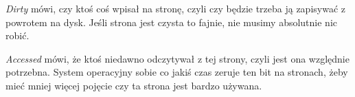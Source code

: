 \textit{Dirty} mówi, czy ktoś coś wpisał na stronę, czyli czy będzie trzeba ją zapisywać z powrotem na dysk.
Jeśli strona jest czysta to fajnie, nie musimy absolutnie nic robić.

\textit{Accessed} mówi, że ktoś niedawno odczytywał z tej strony, czyli jest ona względnie potrzebna. System operacyjny sobie co jakiś czas zeruje ten bit na stronach, żeby mieć mniej więcej pojęcie czy ta strona jest bardzo używana.
